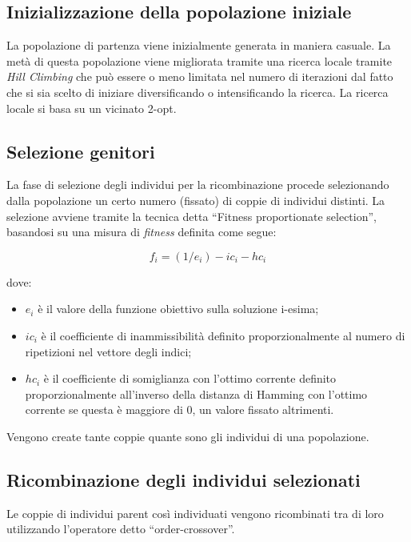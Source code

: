 \documentclass[a4paper]{article}
\begin{document}
        \subsection{Inizializzazione della popolazione iniziale}
            La popolazione di partenza viene inizialmente generata in maniera casuale. La met\`a di questa popolazione
            viene migliorata tramite una ricerca locale tramite \emph{Hill Climbing} che pu\`o essere o meno limitata
            nel numero di iterazioni dal fatto che si sia scelto di iniziare diversificando o intensificando la ricerca.
            La ricerca locale si basa su un vicinato 2-opt.

        \subsection{Selezione genitori}
            La fase di selezione degli individui per la ricombinazione procede selezionando dalla popolazione un certo numero
            (fissato) di coppie di individui distinti.
            La selezione avviene tramite la tecnica detta ``Fitness proportionate selection'', basandosi su una misura di \emph{fitness}
            definita come segue:

            $$f_i = (1 / e_i) - ic_i - hc_i$$

            dove:
            \begin{itemize}
                \item $e_i$ \`e il valore della funzione obiettivo sulla soluzione i-esima;
                \item $ic_i$ \`e il coefficiente di inammissibilit\`a definito proporzionalmente
                    al numero di ripetizioni nel vettore degli indici;
                \item $hc_i$ \`e il coefficiente di somiglianza con l'ottimo corrente definito proporzionalmente
                    all'inverso della distanza di Hamming con l'ottimo corrente se questa \`e maggiore di 0, un valore
                    fissato altrimenti.
            \end{itemize}

            Vengono create tante coppie quante sono gli individui di una popolazione.
        
        \subsection{Ricombinazione degli individui selezionati}
            Le coppie di individui parent cos\`i individuati vengono ricombinati tra di loro utilizzando l'operatore detto
            ``order-crossover''.
\end{document}
